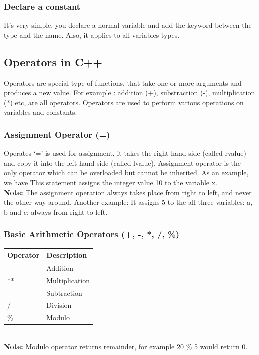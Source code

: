 \documentclass[11pt, a4paper]{article}
\begin{document}
\subsubsection{Declare a constant}
It’s very simple, you declare a normal variable and add the keyword  between the type
and the name. Also, it applies to all variables types.


\subsection{Operators in C++}
Operators are special type of functions, that take one or more arguments
and produces a new value. For example : addition (+), substraction (-),
multiplication (*) etc, are all operators. Operators are used to perform
various operations on variables and constants.

\subsubsection{Assignment Operator (=)}
Operates `=' is used for assignment, it takes the right-hand side (called rvalue)
and copy it into the left-hand side (called lvalue). Assignment operator is the
only operator which can be overloaded but cannot be inherited. As an example, we have
 This statement assigns the integer value 10 to the variable x.\\
\textbf{Note:} The assignment operation always takes place from right to left,
and never the other way around. Another example: 
It assigns 5 to the all three variables: a, b and c; always from right-to-left.

\subsubsection{Basic Arithmetic Operators (+, -, *, /, \%)}

\begin{tabular}{ |p{3cm}||p{5cm}| }
    \hline
    \textbf{Operator} & \textbf{Description} \\
    \hline
    +  & Addition    \\
    ** &   Multiplication  \\
    -  & Subtraction \\
    / & Division \\
    \%    &Modulo\\
    \hline
\end{tabular}\\
\newline\textbf{Note:} Modulo operator returns remainder, for example 20 \% 5 would return 0.

\end{document}

